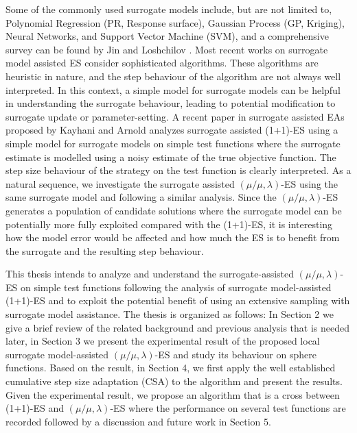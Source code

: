 Some of the commonly used surrogate models include, but are not limited to, Polynomial Regression (PR, Response surface), Gaussian Process (GP, Kriging), Neural Networks, and Support Vector Machine (SVM), and a comprehensive survey can be found by Jin \cite{JIN201161} and Loshchilov \cite{ECJ2016_LMCMA}. Most recent works on surrogate model assisted ES consider sophisticated algorithms. These algorithms are heuristic in nature, and the step behaviour of the algorithm are not always well interpreted. In this context, a simple model for surrogate models can be helpful in understanding the surrogate behaviour, leading to potential modification to surrogate update or parameter-setting. A recent paper in surrogate assisted EAs proposed by Kayhani and Arnold \cite{DBLP:conf/ppsn/KayhaniA18} analyzes surrogate assisted (1+1)-ES using a simple model for surrogate models on simple test functions where the surrogate estimate is modelled using a noisy estimate of the true objective function. The step size behaviour of the strategy on the test function is clearly interpreted. As a natural sequence, we investigate the surrogate assisted $(\mu/\mu,\lambda)$-ES using the same surrogate model and following a similar analysis. Since the $(\mu/\mu,\lambda)$-ES generates a population of candidate solutions where the surrogate model can be potentially more fully exploited compared with the (1+1)-ES, it is interesting how the model error would be affected and how much the ES is to benefit from the surrogate and the resulting step behaviour.

This thesis intends to analyze and understand the surrogate-assisted $(\mu/\mu,\lambda)$-ES on simple test functions following the analysis of surrogate model-assisted (1+1)-ES \cite{DBLP:conf/ppsn/KayhaniA18} and to exploit the potential benefit of using an extensive sampling with surrogate model assistance. The thesis is organized as follows: In Section 2 we give a brief review of the related background and previous analysis that is needed later, in Section 3 we present the experimental result of the proposed local surrogate model-assisted $(\mu/\mu,\lambda)$-ES and study its behaviour on sphere functions. Based on the result, in Section 4, we first apply the well established cumulative step size adaptation (CSA) to the algorithm and present the results. Given the experimental result, we propose an algorithm that is a cross between (1+1)-ES and $(\mu/\mu,\lambda)$-ES where the performance on several test functions are recorded followed by a discussion and future work in Section 5. 


